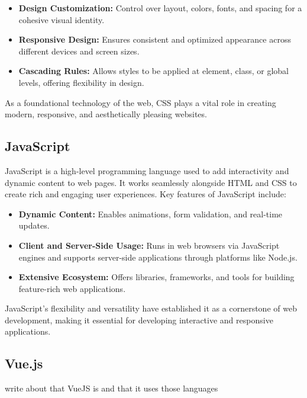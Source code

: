 \begin{itemize}
    \item \textbf{Design Customization:} Control over layout, colors, fonts, and spacing for a cohesive visual identity.
    \item \textbf{Responsive Design:} Ensures consistent and optimized appearance across different devices and screen sizes.
    \item \textbf{Cascading Rules:} Allows styles to be applied at element, class, or global levels, offering flexibility in design.
\end{itemize}

As a foundational technology of the web, CSS plays a vital role in creating modern, responsive, and aesthetically pleasing websites.

\cite{CSS-Wikipedia}

\subsection{JavaScript}

JavaScript is a high-level programming language used to add interactivity and dynamic content to web pages. It works seamlessly alongside HTML and CSS to create rich and engaging user experiences. Key features of JavaScript include:

\begin{itemize}
    \item \textbf{Dynamic Content:} Enables animations, form validation, and real-time updates.
    \item \textbf{Client and Server-Side Usage:} Runs in web browsers via JavaScript engines and supports server-side applications through platforms like Node.js.
    \item \textbf{Extensive Ecosystem:} Offers libraries, frameworks, and tools for building feature-rich web applications.
\end{itemize}

JavaScript’s flexibility and versatility have established it as a cornerstone of web development, making it essential for developing interactive and responsive applications.

\cite{JavaScript-Wikipedia}

\subsection{Vue.js}

write about that VueJS is and that it uses those languages

